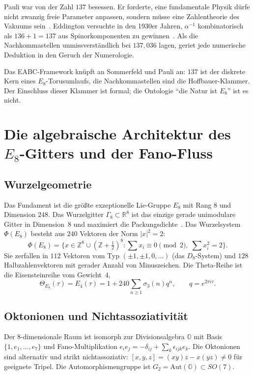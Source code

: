 \documentclass[11pt,a4paper]{article}
\theoremstyle{definition}
\theoremstyle{remark}
\numberwithin{equation}{section}
\begin{document}
Pauli war von der Zahl $137$ besessen.
Er forderte, eine fundamentale Physik dürfe nicht zwanzig freie Parameter anpassen, sondern müsse eine Zahlentheorie des Vakuums sein~\cite{pauli1946}.
Eddington versuchte in den 1930er Jahren, $\alpha^{-1}$ kombinatorisch als $136+1=137$ aus Spinorkomponenten zu gewinnen~\cite{eddington1936}.
Als die Nachkommastellen unmissverständlich bei $137{,}036$ lagen, geriet jede numerische Deduktion in den Geruch der Numerologie.

Das EABC-Framework knüpft an Sommerfeld und Pauli an:
$137$ ist der diskrete Kern eines $E_8$-Torusumlaufs, die Nachkommastellen sind die Hoffbauer-Klammer.
Der Einschluss dieser Klammer ist formal; die Ontologie ``die Natur ist $E_8$'' ist es nicht.

\section{Die algebraische Architektur des $E_8$-Gitters und der Fano-Fluss}

\subsection{Wurzelgeometrie}
Das Fundament ist die größte exzeptionelle Lie-Gruppe $E_8$ mit Rang $8$ und Dimension $248$.
Das Wurzelgitter $\Gamma_8\subset\mathbb{R}^8$ ist das einzige gerade unimodulare Gitter in Dimension~$8$ und maximiert die Packungsdichte~\cite{viazovska2017,conwaysloane}.
Das Wurzelsystem $\Phi(E_8)$ besteht aus $240$ Vektoren der Norm $|x|^2=2$:
\begin{equation}
\Phi(E_8)
=\bigl\{ x\in\mathbb{Z}^8\cup(\mathbb{Z}+\tfrac12)^8
:\textstyle\sum x_i\equiv 0\pmod 2,\; \sum x_i^2=2\bigr\}.
\end{equation}
Sie zerfallen in $112$ Vektoren vom Typ $(\pm 1,\pm 1,0,\dots)$ (das $D_8$-System) und $128$ Halbzahlenvektoren mit gerader Anzahl von Minuszeichen.
Die Theta-Reihe ist die Eisensteinreihe vom Gewicht~$4$,
\begin{equation}
\Theta_{E_8}(\tau)=E_4(\tau)=1+240\sum_{n\ge 1}\sigma_3(n)q^n,\qquad q=e^{2\pi i\tau}.
\end{equation}

\subsection{Oktonionen und Nichtassoziativität}
Der 8-dimensionale Raum ist isomorph zur Divisionsalgebra $\mathbb{O}$ mit Basis $\{1,e_1,\dots,e_7\}$ und Fano-Multiplikation
$e_ie_j=-\delta_{ij}+\sum_k\epsilon_{ijk}e_k$.
Die Oktonionen sind alternativ und strikt nichtassoziativ:
$[x,y,z]=(xy)z-x(yz)\neq 0$ für geeignete Tripel.
Die Automorphismengruppe ist $G_2=\mathrm{Aut}(\mathbb{O})\subset SO(7)$.
\end{document}
